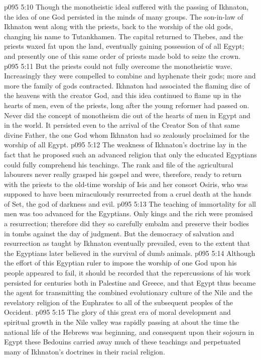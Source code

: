 \vs p095 5:10 \pc Though the monotheistic ideal suffered with the passing of Ikhnaton, the idea of one God persisted in the minds of many groups. The son\hyp{}in\hyp{}law of Ikhnaton went along with the priests, back to the worship of the old gods, changing his name to Tutankhamen. The capital returned to Thebes, and the priests waxed fat upon the land, eventually gaining possession of  of all Egypt; and presently one of this same order of priests made bold to seize the crown.
\vs p095 5:11 But the priests could not fully overcome the monotheistic wave. Increasingly they were compelled to combine and hyphenate their gods; more and more the family of gods contracted. Ikhnaton had associated the flaming disc of the heavens with the creator God, and this idea continued to flame up in the hearts of men, even of the priests, long after the young reformer had passed on. Never did the concept of monotheism die out of the hearts of men in Egypt and in the world. It persisted even to the arrival of the Creator Son of that same divine Father, the one God whom Ikhnaton had so zealously proclaimed for the worship of all Egypt.
\vs p095 5:12 The weakness of Ikhnaton’s doctrine lay in the fact that he proposed such an advanced religion that only the educated Egyptians could fully comprehend his teachings. The rank and file of the agricultural labourers never really grasped his gospel and were, therefore, ready to return with the priests to the old\hyp{}time worship of Isis and her consort Osiris, who was supposed to have been miraculously resurrected from a cruel death at the hands of Set, the god of darkness and evil.
\vs p095 5:13 The teaching of immortality for all men was too advanced for the Egyptians. Only kings and the rich were promised a resurrection; therefore did they so carefully embalm and preserve their bodies in tombs against the day of judgment. But the democracy of salvation and resurrection as taught by Ikhnaton eventually prevailed, even to the extent that the Egyptians later believed in the survival of dumb animals.
\vs p095 5:14 \pc Although the effort of this Egyptian ruler to impose the worship of one God upon his people appeared to fail, it should be recorded that the repercussions of his work persisted for centuries both in Palestine and Greece, and that Egypt thus became the agent for transmitting the combined evolutionary culture of the Nile and the revelatory religion of the Euphrates to all of the subsequent peoples of the Occident.
\vs p095 5:15 The glory of this great era of moral development and spiritual growth in the Nile valley was rapidly passing at about the time the national life of the Hebrews was beginning, and consequent upon their sojourn in Egypt these Bedouins carried away much of these teachings and perpetuated many of Ikhnaton’s doctrines in their racial religion.
